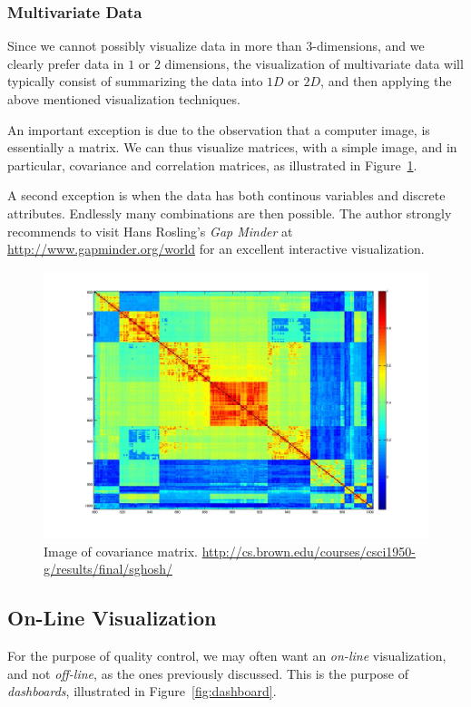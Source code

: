 \subsubsection{Multivariate Data}
Since we cannot possibly visualize data in more than $3$-dimensions, and we clearly prefer data in $1$ or $2$ dimensions, the visualization of multivariate data will typically consist of summarizing the data into $1D$ or $2D$, and then applying the above mentioned visualization techniques.

An important exception is due to the observation that a computer image, is essentially a matrix. 
We can thus visualize matrices, with a simple image, and in particular, covariance and correlation matrices, as illustrated in Figure~\ref{fig:covariance_image}.

A second exception is when the data has both continous variables and discrete attributes. 
Endlessly many combinations are then possible.
The author strongly recommends to visit Hans Rosling's \emph{Gap Minder} at \url{http://www.gapminder.org/world} for an excellent interactive visualization. 


\begin{figure}[h]
\centering
\includegraphics[height=0.3\textheight]{art/covarianceSupervised}
\caption[Covariance Matrix]{Image of covariance matrix. \newline
\url{http://cs.brown.edu/courses/csci1950-g/results/final/sghosh/}}
\label{fig:covariance_image}
\end{figure}




\subsection{On-Line Visualization}
For the purpose of quality control, we may often want an \emph{on-line} visualization, and not \emph{off-line}, as the ones previously discussed.
This is the purpose of \emph{dashboards}, illustrated in Figure~\ref{fig:dashboard}.

